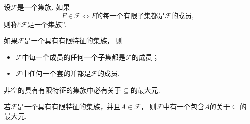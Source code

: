\begin{definition}
设\(\mathscr{F}\)是一个集族.
如果\begin{equation*}
	F \in \mathscr{F}
	\iff
	\text{$F$的每一个有限子集都是$\mathscr{F}$的成员},
\end{equation*}
则称“\(\mathscr{F}\)是一个集族”.
\end{definition}

\begin{lemma}
如果\(\mathscr{F}\)是一个具有有限特征的集族，
则\begin{itemize}
	\item \(\mathscr{F}\)中每一个成员的任何一个子集都是\(\mathscr{F}\)的成员；
	\item \(\mathscr{F}\)中任何一个套的并都是\(\mathscr{F}\)的成员.
\end{itemize}
\end{lemma}

\begin{theorem}[图基引理]
非空的具有有限特征的集族中必有关于\(\subseteq\)的最大元.
\end{theorem}

\begin{corollary}
若\(\mathscr{F}\)是一个具有有限特征的集族，并且\(A \in \mathscr{F}\)，
则\(\mathscr{F}\)中有一个包含\(A\)的关于\(\subseteq\)的最大元.
\end{corollary}
